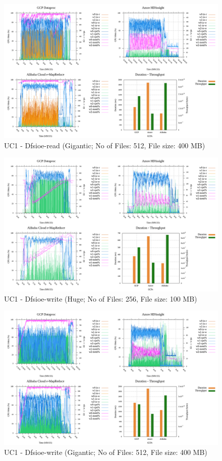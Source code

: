 \documentclass[review]{elsarticle}
\begin{document}
\begin{figure}[p]
	\caption{UC1 - Dfsioe-read (Gigantic; No of Files: 512, File size: 400 MB)}
	\label{fig:uc1-dfsioer-g-cmidt}
	\includegraphics[width=\textwidth]{uc1-dfsioer-g-cmidt}
	\centering
\end{figure}

\begin{figure}[p]
	\caption{UC1 - Dfsioe-write (Huge; No of Files: 256, File size: 100 MB)}
	\label{fig:uc1-dfsioew-h-cmidt}
	\includegraphics[width=\textwidth]{uc1-dfsioew-h-cmidt}
	\centering
\end{figure}

\begin{figure}[p]
	\caption{UC1 - Dfsioe-write (Gigantic; No of Files: 512, File size: 400 MB)}
	\label{fig:uc1-dfsioew-g-cmidt}
	\includegraphics[width=\textwidth]{uc1-dfsioew-g-cmidt}
	\centering
\end{figure}
\end{document}
